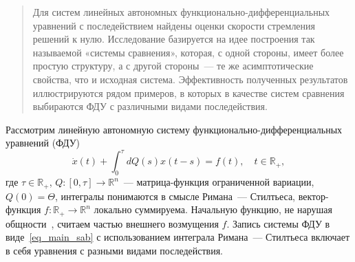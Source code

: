 
\maketitle

\begin{abstract}
Для систем линейных автономных функционально-дифферен\-циальных уравнений с последействием найдены оценки скорости стремления решений к нулю. Исследование базируется на идее построения так называемой «системы сравнения», которая, с одной стороны, имеет более простую структуру, а с другой стороны~--- те же асимптотические свойства, что и исходная система. Эффективность полученных результатов иллюстрируются рядом примеров, в которых в качестве систем сравнения выбираются ФДУ с различными видами последействия.


\end{abstract}


Рассмотрим линейную автономную систему функционально-диф\-фе\-рен\-ци\-аль\-ных уравнений (ФДУ)
\begin{equation}
\label{eq_main_sab}
\dot x(t)+\int_0^\tau dQ(s)x(t-s)=f(t),\quad t\in\mathbb R_+,
\end{equation}
где $\tau\in\mathbb R_+$,  $Q\colon[0,\tau]\to\mathbb R^n$~--- матрица-функция ограниченной вариации, $Q(0)=\Theta$, интегралы понимаются в смысле Римана~--- Стилтьеса, вектор-функция $f\colon\mathbb R_+\to\mathbb R^n$ локально суммируема. Начальную функцию, не нарушая общности~\cite[с.\,9--10]{bib_amr_sab}, считаем частью внешнего возмущения $f$.
Запись системы ФДУ в виде~\eqref{eq_main_sab} с использованием интеграла Римана~--- Стилтьеса включает в себя уравнения с разными видами последействия.

